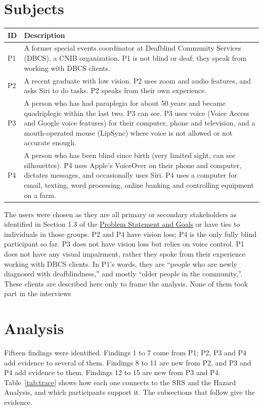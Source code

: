 \documentclass[12pt, titlepage]{article}
\begin{document}
\section{Subjects}\label{sec:subjects}
\begin{tabularx}{\textwidth}{l X}
\toprule
\textbf{ID} & \textbf{Description}\\
\midrule
P1 & A former special events coordinator at Deafblind Community Services (DBCS), a CNIB organization. P1 is not blind or deaf; they speak from working with DBCS clients.\\
P2 & A recent graduate with low vision. P2 uses zoom and audio features, and asks Siri to do tasks. P2 speaks from their own experience.\\
P3 & A person who has had paraplegia for about 50 years and became quadriplegic within the last two. P3 can see. P3 uses voice (Voice Access and Google voice features) for their computer, phone and television, and a mouth-operated mouse (LipSync) where voice is not allowed or not accurate enough.\\
P4 & A person who has been blind since birth (very limited sight, can see silhouettes). P4 uses Apple's VoiceOver on their phone and computer, dictates messages, and occasionally uses Siri. P4 uses a computer for email, texting, word processing, online banking and controlling equipment on a farm.\\
\bottomrule
\end{tabularx}
The users were chosen as they are all primary or secondary stakeholders as identified in Section 1.3 of the \href{https://github.com/NaturalControl/natural-control/blob/main/pdfs/ProblemStatementAndGoals/ProblemStatement.pdf}{Problem Statement and Goals}
or have ties to individuals in those groups. P2 and P4 have vision loss; P4 is the only fully blind participant so far. P3 does not have vision loss but relies on voice control.
P1 does not have any visual impairment, rather they spoke from their experience working with DBCS clients. In P1's words, they are ``people who are newly diagnosed with deafblindness,'' and mostly ``older people in the community,''. 
These clients are described here only to frame the analysis. None of them took part in the interviews
\section{Analysis}\label{sec:analysis}

Fifteen findings were identified. Findings 1 to 7 come from P1; P2, P3 and P4 add evidence to several of them. Findings 8 to 11 are new from P2, and P3 and P4 add evidence to them. Findings 12 to 15 are new from P3 and P4. Table~\ref{tab:trace} shows how each one connects to the SRS and the Hazard Analysis, and which participants support it. The subsections that follow give the evidence.
\end{document}
